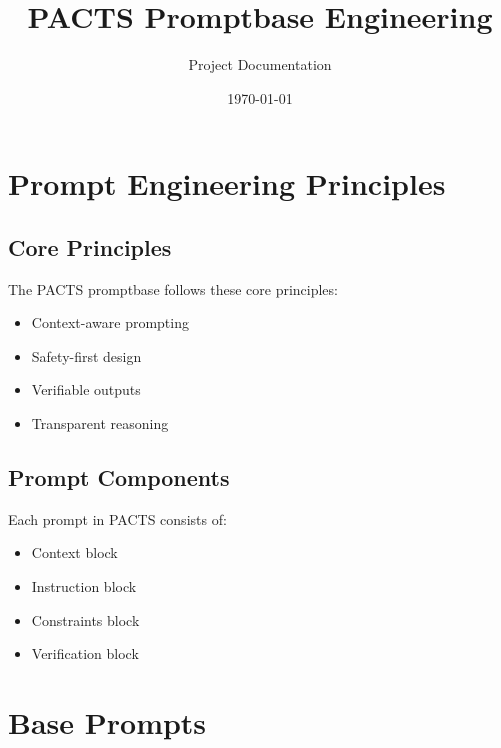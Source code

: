 \documentclass[11pt]{book}
\title{PACTS Promptbase Engineering}
\author{Project Documentation}
\date{\today}
\begin{document}
\maketitle
\tableofcontents

\chapter{Prompt Engineering Principles}

\section{Core Principles}
The PACTS promptbase follows these core principles:
\begin{itemize}
  \item Context-aware prompting
  \item Safety-first design
  \item Verifiable outputs
  \item Transparent reasoning
\end{itemize}

\section{Prompt Components}
Each prompt in PACTS consists of:
\begin{itemize}
  \item Context block
  \item Instruction block
  \item Constraints block
  \item Verification block
\end{itemize}

\chapter{Base Prompts}
\end{document}
